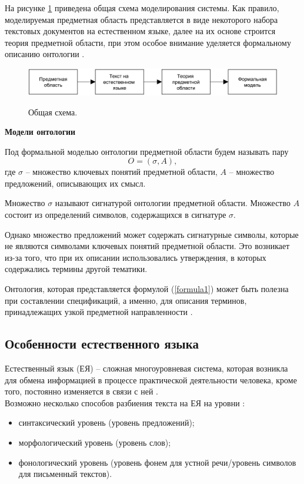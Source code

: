 На рисунке \ref{fig1:image} приведена общая схема моделирования системы. Как правило, моделируемая предметная область представляется в виде некоторого набора текстовых документов на естественном языке, далее на их основе строится теория предметной области, при этом особое внимание уделяется формальному описанию онтологии \cite{solution_task}.
\begin{figure}[h]
	\begin{center}
		{\includegraphics[scale = 0.6]{img/ontology.pdf}}
		\caption{Общая схема.}
		\label{fig1:image}
	\end{center}
\end{figure}

\newpage

\textbf{Модели онтологии}

Под формальной моделью онтологии предметной области будем называть пару
\begin{equation}\label{formula1}
	O = \left(  \sigma, A   \right),
\end{equation}
где $\sigma$ -- множество ключевых понятий предметной области, $A$ -- множество предложений, описывающих их смысл. 

Множество $\sigma$ называют сигнатурой онтологии предметной области. Множество $A$ состоит из определений символов, содержащихся в сигнатуре $\sigma$. 

Однако множество предложений может содержать сигнатурные символы, которые не являются символами ключевых понятий предметной области. Это возникает из-за того, что при их описании  использовались утверждения, в которых содержались термины другой тематики.

Онтология, которая представляется формулой (\ref{formula1}) может быть полезна при составлении спецификаций, а именно, для описания терминов, принадлежащих узкой предметной направленности \cite{solution_task}. \newline

\subsection{Особенности естественного языка}\label{sec:features_NL}
Естественный язык (ЕЯ) -- сложная многоуровневая система, которая возникла для обмена информацией в процессе практической деятельности человека, кроме того, постоянно изменяется в связи с ней \cite{lingvocabulary, auto_processing_nl}. \\
%
Возможно несколько способов разбиения текста на ЕЯ на уровни \cite{natural_lang_processing}:
%
\begin{itemize}
	\item синтаксический уровень (уровень предложений);
	
	\item морфологический уровень (уровень слов);
	
	\item фонологический уровень (уровень фонем для устной речи/уровень символов для письменный текстов).
\end{itemize}

